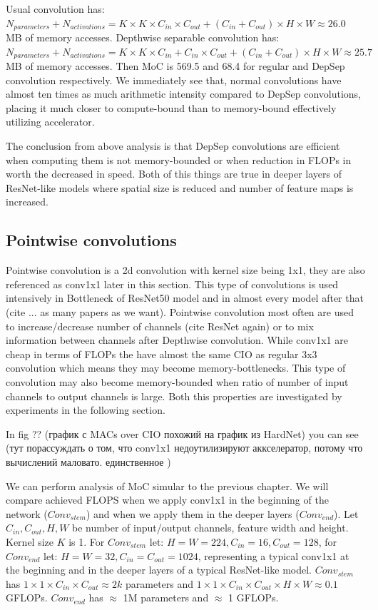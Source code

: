 Usual convolution has: $ N_{parameters} + N_{activations} = K \times K \times C_{in} \times C_{out} + (C_{in} + C_{out}) \times H \times W \approx 26.0$ MB of memory accesses. Depthwise separable convolution has: $ N_{parameters} + N_{activations} = K \times K \times C_{in} + C_{in} \times C_{out} + (C_{in} + C_{out}) \times H \times W \approx 25.7$ MB of memory accesses. Then MoC is 569.5 and 68.4 for regular and DepSep convolution respectively. We immediately see that, normal convolutions have almost ten times as much arithmetic intensity compared to DepSep convolutions, placing it much closer to compute-bound than to memory-bound effectively utilizing accelerator. 

The conclusion from above analysis is that DepSep convolutions are efficient when computing them is not memory-bounded or when reduction in FLOPs in worth the decreased in speed. Both of this things are true in deeper layers of ResNet-like models where spatial size is reduced and number of feature maps is increased. 

\subsection{Pointwise convolutions}

Pointwise convolution is a 2d convolution with kernel size being 1x1, they are also referenced as conv1x1 later in this section. This type of convolutions is used intensively in Bottleneck of ResNet50 model and in almost every model after that (cite ... as many papers as we want). Pointwise convolution most often are used to increase/decrease number of channels (cite ResNet again) or to mix information between channels after Depthwise convolution. While conv1x1 are cheap in terms of FLOPs the have almost the same CIO as regular 3x3 convolution which means they may become memory-bottlenecks. This type of convolution may also become memory-bounded when ratio of number of input channels to output channels is large. Both this properties are investigated by experiments in the following section.

In fig ?? (график с MACs over CIO похожий на график из HardNet) you can see 
(тут порассуждать о том, что conv1x1 недоутилизируют аккселератор, потому что вычислений маловато. единственное )

We can perform analysis of MoC simular to the previous chapter. We will compare achieved FLOPS when we apply conv1x1 in the beginning of the network ($Conv_{stem}$) and when we apply them in the deeper layers ($Conv_{end}$). Let $C_{in}, C_{out}, H, W$ be number of input/output channels, feature width and height. Kernel size $K$ is 1. For $Conv_{stem}$ let:  $H=W=224, C_{in} = 16, C_{out}=128$, for $Conv_{end}$ let: $H=W=32, C_{in} = C_{out}=1024$, representing a typical conv1x1 at the beginning and in the deeper layers of a typical ResNet-like model.
$Conv_{stem}$ has $ 1 \times 1 \times C_{in} \times C_{out} \approx 2k$ parameters and $ 1 \times 1 \times C_{in} \times C_{out} \times H \times W \approx 0.1 $ GFLOPs. $Conv_{end}$ has $\approx$ 1M parameters and $\approx$ 1 GFLOPs. 

